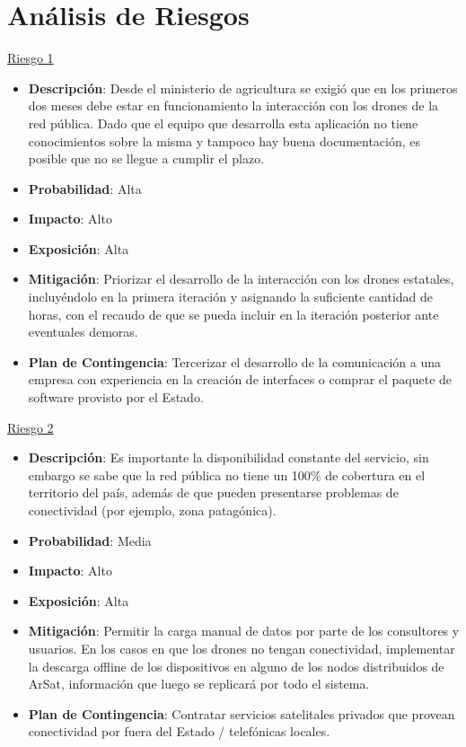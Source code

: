 \section{Análisis de Riesgos}

\underline{Riesgo 1}

\begin{itemize} \itemsep -2pt
    \item \textbf{Descripción}: Desde el ministerio de agricultura se exigió que en los primeros dos meses debe estar en funcionamiento la interacción con los drones de la red pública. Dado que el equipo que desarrolla esta aplicación no tiene conocimientos sobre la misma y tampoco hay buena documentación, es posible que no se llegue a cumplir el plazo.
    \item \textbf{Probabilidad}: Alta
    \item \textbf{Impacto}: Alto
    \item \textbf{Exposición}: Alta
    \item \textbf{Mitigación}: Priorizar el desarrollo de la interacción con los drones estatales, incluyéndolo en la primera iteración y asignando la suficiente cantidad de horas, con el recaudo de que se pueda incluir en la iteración posterior ante eventuales demoras.
    \item \textbf{Plan de Contingencia}: Tercerizar el desarrollo de la comunicación a una empresa con experiencia en la creación de interfaces o comprar el paquete de software provisto por el Estado.
\end{itemize}
 
\underline{Riesgo 2} 

\begin{itemize} \itemsep -2pt
    \item \textbf{Descripción}: Es importante la disponibilidad constante del servicio, sin embargo se sabe que la red pública no tiene un 100\% de cobertura en el territorio del país, además de que pueden presentarse problemas de conectividad (por ejemplo, zona patagónica).
    \item \textbf{Probabilidad}: Media
    \item \textbf{Impacto}: Alto
    \item \textbf{Exposición}: Alta
    \item \textbf{Mitigación}: Permitir la carga manual de datos por parte de los consultores y usuarios. En los casos en que los drones no tengan conectividad, implementar la descarga offline de los dispositivos en alguno de los nodos distribuidos de ArSat, información que luego se replicará por todo el sistema.
    \item \textbf{Plan de Contingencia}: Contratar servicios satelitales privados que provean conectividad por fuera del Estado / telefónicas locales.
\end{itemize}

